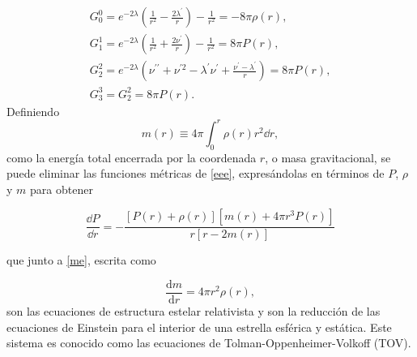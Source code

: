 \begin{equation}
    \begin{array} { l } { G _ { 0 } ^ { 0 } = e ^ { - 2 \lambda } \left( \frac { 1 } { r ^ { 2 } } - \frac { 2 \lambda ^ { \prime } } { r } \right) - \frac { 1 } { r ^ { 2 } } = - 8 \pi  \rho ( r ) }, \\ { G _ { 1 } ^ { 1 } = e ^ { - 2 \lambda } \left( \frac { 1 } { r ^ { 2 } } + \frac { 2 \nu ^ { \prime } } { r } \right) - \frac { 1 } { r ^ { 2 } } = 8 \pi  P ( r ) }, \\ { G _ { 2 } ^ { 2 } = e ^ { - 2 \lambda } \left( \nu ^ { \prime \prime } + \nu ^ { \prime 2 } - \lambda ^ { \prime } \nu ^ { \prime } + \frac { \nu ^ { \prime } - \lambda ^ { \prime } } { r } \right) = 8 \pi  P ( r ) }, \\ { G _ { 3 } ^ { 3 } = G _ { 2 } ^ { 2 } = 8 \pi  P ( r ) }. \end{array}
    \label{eee}
\end{equation}
Definiendo
\begin{equation}
    m ( r ) \equiv 4 \pi \int _ { 0 } ^ { r } \rho ( r ) r ^ { 2 } \dd r,
    \label{me}
\end{equation}
como la energía total encerrada por la coordenada $r$, o masa gravitacional, se puede eliminar las funciones métricas de \eqref{eee}, expresándolas en términos de $P$, $\rho$ y $m$ para obtener 

\begin{equation}
    \frac { \dd P } { \dd r } = - \frac { [ P ( r ) + \rho ( r ) ] \left[ m ( r ) + 4 \pi r ^ { 3 } P ( r ) \right] } { r [ r - 2 m ( r ) ] }
    \label{dptov}
\end{equation}

que junto a \eqref{me}, escrita como

\begin{equation}
    \frac { \mathrm { d } m } { \mathrm { d } r } = 4 \pi r ^ { 2 } \rho(r),
    \label{dmtov}
\end{equation}
son las ecuaciones de estructura estelar relativista y son la reducción de las ecuaciones de Einstein para el interior de una estrella esférica y estática. Este sistema es conocido como las ecuaciones de Tolman-Oppenheimer-Volkoff (TOV).

